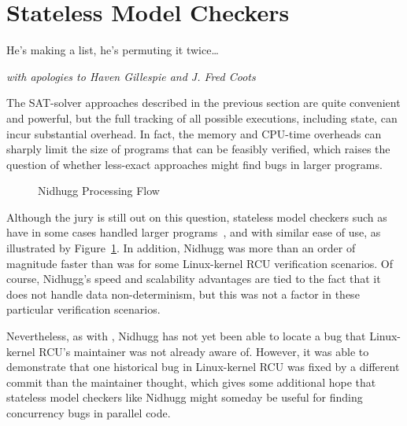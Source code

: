 
\section{Stateless Model Checkers}
\label{sec:formal:Stateless Model Checkers}
%
\epigraph{He's making a list, he's permuting it twice\dots}
	{\emph{with apologies to Haven Gillespie and J. Fred Coots}}

The SAT-solver approaches described in the previous section are quite
convenient and powerful, but the full tracking of all possible
executions, including state, can incur substantial overhead.
In fact, the memory and CPU-time overheads can sharply limit the size
of programs that can be feasibly verified, which raises the question
of whether less-exact approaches might find bugs in larger programs.

\begin{figure}
\centering
{}
\caption{Nidhugg Processing Flow}
\label{fig:formal:Nidhugg Processing Flow}
\end{figure}

Although the jury is still out on this question, stateless model
checkers such as ~\cite{CarlLeonardsson2014Nidhugg} have in
some cases handled larger programs~\cite{SMC-TreeRCU}, and with
similar ease of use, as illustrated by
Figure~\ref{fig:formal:Nidhugg Processing Flow}.
In addition, Nidhugg was more than an order of magnitude faster than
was  for some Linux-kernel RCU verification scenarios.
Of course, Nidhugg's speed and scalability advantages are tied to
the fact that it does not handle data non-determinism, but this
was not a factor in these particular verification scenarios.

Nevertheless, as with , Nidhugg has not yet been able to
locate a bug that Linux-kernel RCU's maintainer was not already
aware of.
However, it was able to demonstrate that one historical bug in
Linux-kernel RCU was fixed by a different commit than the maintainer
thought, which gives some additional hope that stateless model checkers
like Nidhugg might someday be useful for finding concurrency bugs in
parallel code.
